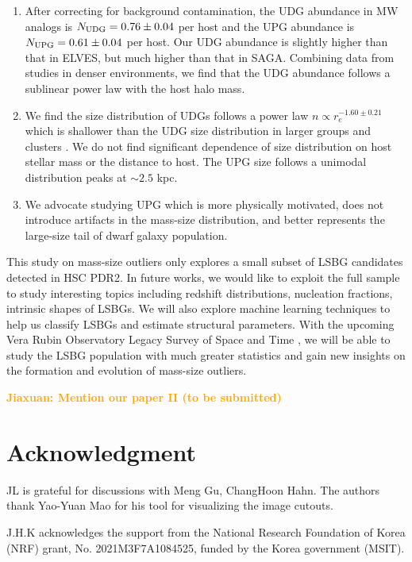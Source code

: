 \documentclass[twocolumn,astrosymb,twocolappendix]{aastex631}
\newcommand{\jiaxuan}[1]{\textcolor{orange}{\textbf{Jiaxuan: #1}}}
\begin{document}
\begin{CJK*}{UTF8}{gbsn}
\begin{enumerate}
    \item After correcting for background contamination, the UDG abundance in MW analogs is $N_{\rm UDG} = 0.76\pm 0.04$ per host and the UPG abundance is $N_{\rm UPG} = 0.61 \pm 0.04$ per host. Our UDG abundance is slightly higher than that in ELVES, but much higher than that in SAGA. Combining data from studies in denser environments, we find that the UDG abundance follows a sublinear power law with the host halo mass. 
    \item We find the size distribution of UDGs follows a power law $n\propto r_e^{-1.60\pm0.21}$ which is shallower than the UDG size distribution in larger groups and clusters \citep{vdBurg2016,vdBurg2017}. We do not find significant dependence of size distribution on host stellar mass or the distance to host. The UPG size follows a unimodal distribution peaks at $\sim 2.5$ kpc. 
    
    \item We advocate studying UPG which is more physically motivated, does not introduce artifacts in the mass-size distribution, and better represents the large-size tail of dwarf galaxy population. 
\end{enumerate}

This study on mass-size outliers only explores a small subset of LSBG candidates detected in HSC PDR2. In future works, we would like to exploit the full sample to study interesting topics including redshift distributions, nucleation fractions, intrinsic shapes of LSBGs. We will also explore machine learning techniques to help us classify LSBGs and estimate structural parameters. With the upcoming Vera Rubin Observatory Legacy Survey of Space and Time \citep[LSST, ][]{lsst2009,LSST2019}, we will be able to study the LSBG population with much greater statistics and gain new insights on the formation and evolution of mass-size outliers. 

\jiaxuan{Mention our paper II (to be submitted)}

\section*{Acknowledgment}
JL is grateful for discussions with Meng Gu, ChangHoon Hahn. The authors thank Yao-Yuan Mao for his tool for visualizing the image cutouts. 

J.H.K acknowledges the support from the National Research Foundation of Korea (NRF) grant, No. 2021M3F7A1084525, funded by the Korea government (MSIT).


\end{CJK*}
\end{document}
